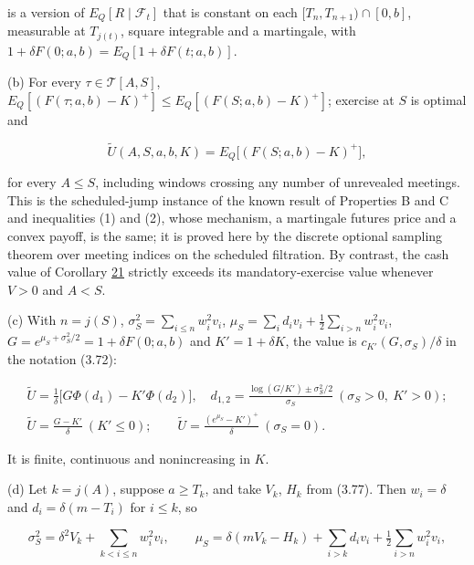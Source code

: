 \documentclass[11pt]{article}
\begin{document}
is a version of \(E_Q[R \mid \mathcal F_t]\) that is constant on each \([T_n, T_{n+1}) \cap [0, b]\), measurable at \(T_{j(t)}\), square integrable and a martingale, with \(1 + \delta F(0; a, b) = E_Q[1 + \delta F(t; a, b)]\).

(b) For every \(\tau \in \mathcal T[A, S]\), \(E_Q[(F(\tau; a, b) - K)^+] \le E_Q[(F(S; a, b) - K)^+]\); exercise at \(S\) is optimal and

\begin{equation*}
\tilde U(A, S, a, b, K) = E_Q\bigl[ (F(S; a, b) - K)^+ \bigr], \tag{3.101}\label{eq:3.101}
\end{equation*}

for every \(A \le S\), including windows crossing any number of unrevealed meetings. This is the scheduled-jump instance of the known result of \cite{lieu1990option} Properties B and C and \cite{chen1993pricing} inequalities (1) and (2), whose mechanism, a martingale futures price and a convex payoff, is the same; it is proved here by the discrete optional sampling theorem over meeting indices on the scheduled filtration. By contrast, the cash value of Corollary \hyperref[res:Corollary-21]{21} strictly exceeds its mandatory-exercise value whenever \(V > 0\) and \(A < S\).

(c) With \(n = j(S)\), \(\sigma_S^2 = \sum_{i \le n} w_i^2 v_i\), \(\mu_S = \sum_i d_i v_i + \tfrac12 \sum_{i > n} w_i^2 v_i\), \(G = e^{\mu_S + \sigma_S^2 / 2} = 1 + \delta F(0; a, b)\) and \(K' = 1 + \delta K\), the value is \(c_{K'}(G, \sigma_S) / \delta\) in the notation (3.72):

\begin{equation*}
\begin{gathered}
\tilde U = \frac{1}{\delta} \bigl[ G \Phi(d_1) - K' \Phi(d_2) \bigr], \quad d_{1,2} = \frac{\log(G / K') \pm \sigma_S^2 / 2}{\sigma_S} \ (\sigma_S > 0,\ K' > 0); \\
\tilde U = \frac{G - K'}{\delta} \ (K' \le 0); \qquad \tilde U = \frac{(e^{\mu_S} - K')^+}{\delta} \ (\sigma_S = 0).
\end{gathered} \tag{3.102}\label{eq:3.102}
\end{equation*}

It is finite, continuous and nonincreasing in \(K\).

(d) Let \(k = j(A)\), suppose \(a \ge T_k\), and take \(V_k\), \(H_k\) from (3.77). Then \(w_i = \delta\) and \(d_i = \delta (m - T_i)\) for \(i \le k\), so

\begin{equation*}
\sigma_S^2 = \delta^2 V_k + \sum_{k < i \le n} w_i^2 v_i, \qquad \mu_S = \delta (m V_k - H_k) + \sum_{i > k} d_i v_i + \tfrac12 \sum_{i > n} w_i^2 v_i, \tag{3.103}\label{eq:3.103}
\end{equation*}
\end{document}
